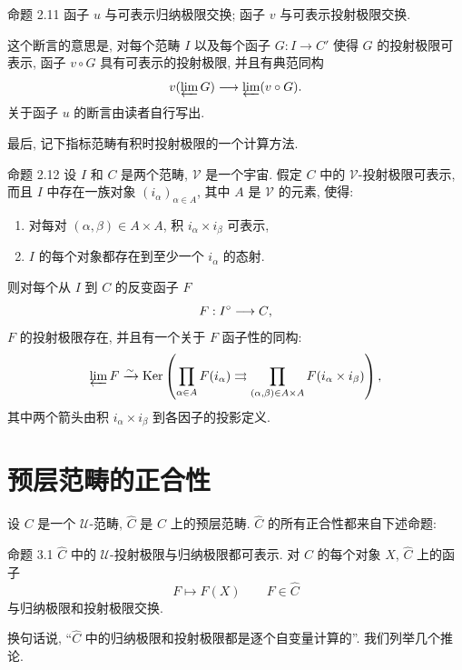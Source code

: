 \begin{enonce*}{命题 2.11}
函子 $u$ 与可表示归纳极限交换;
函子 $v$ 与可表示投射极限交换.
\end{enonce*}

这个断言的意思是, 对每个范畴 $I$ 以及每个函子
$G:I\rightarrow C'$ 使得 $G$ 的投射极限可表示, 函子 $v\circ G$ 具有可表示的投射极限,
并且有典范同构
$$
v(\varprojlim G)\longrightarrow \varprojlim(v\circ G){}.
$$
关于函子 $u$ 的断言由读者自行写出.

最后, 记下指标范畴有积时投射极限的一个计算方法.

\begin{enonce*}{命题 2.12}
设 $I$ 和 $C$ 是两个范畴, $𝒱$ 是一个宇宙.
假定 $C$ 中的 $𝒱$-投射极限可表示,
而且 $I$ 中存在一族对象 $(i_\alpha)_{\alpha\in A}$,
其中 $A$ 是 $𝒱$ 的元素, 使得:
\begin{enumerate}
\renewcommand{\labelenumi}{\theenumi)}
\item 对每对 $(\alpha,\beta)\in A\times A$, 积 $i_\alpha\times i_\beta$ 可表示,

\item $I$ 的每个对象都存在到至少一个 $i_\alpha$ 的态射.
\end{enumerate}


则对每个从 $I$ 到 $C$ 的反变函子 $F$
$$
F:I^\circ\longrightarrow C{},
$$
$F$ 的投射极限存在, 并且有一个关于 $F$ 函子性的同构:
$$
\varprojlim F\xrightarrow{\sim} \operatorname{Ker} \left(\prod_{\alpha\in
  A} F(i_\alpha)\rightrightarrows \prod_{(\alpha,\beta)\in A\times A}
F(i_\alpha \times i_\beta)\right){},
$$
其中\pageoriginale{}两个箭头由积 $i_\alpha\times i_\beta$ 到各因子的投影定义.
\end{enonce*}



\section{预层范畴的正合性}

设 $C$ 是一个 $𝒰$-范畴, $\widehat{C}$ 是 $C$ 上的预层范畴.
$\widehat{C}$ 的所有正合性都来自下述命题:

\begin{enonce*}{命题 3.1}
$\widehat{C}$ 中的 $𝒰$-投射极限与归纳极限都可表示.
对 $C$ 的每个对象 $X$, $\widehat{C}$ 上的函子
$$
F\longmapsto F(X)\qquad F\in \widehat{C}
$$
与归纳极限和投射极限交换.

换句话说, “$\widehat{C}$ 中的归纳极限和投射极限都是逐个自变量计算的”.
我们列举几个推论.
\end{enonce*}

